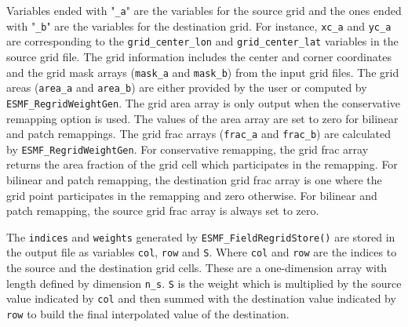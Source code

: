 Variables ended with "{\tt \_a}" are the variables for the source grid and the ones ended with "{\tt \_b}"
are the variables for the destination grid. For instance, {\tt xc\_a} and {\tt yc\_a} are corresponding
to the {\tt grid\_center\_lon} and {\tt grid\_center\_lat} variables in the source grid file.
The grid information includes the center and corner coordinates and the grid mask 
arrays ({\tt mask\_a} and {\tt mask\_b}) from the input grid files.
The grid areas ({\tt area\_a} and {\tt area\_b}) are either provided by the user or computed by 
{\tt ESMF\_RegridWeightGen}. The grid area array is only output when the conservative remapping 
option is used. The values of the area array are set to zero for bilinear and patch remappings.
The grid frac arrays ({\tt frac\_a} and {\tt frac\_b}) are calculated by {\tt ESMF\_RegridWeightGen}. 
For conservative remapping, the grid frac array 
returns the area fraction of the grid cell which participates in the remapping. 
For bilinear and patch remapping, the
destination grid frac array is one where the grid point participates in the remapping
and zero otherwise. For bilinear and patch remapping, the source grid frac array
is always set to zero.

The {\tt indices} and {\tt weights} generated by {\tt ESMF\_FieldRegridStore()} are stored in the output
file as variables {\tt col}, {\tt row} and {\tt S}. Where {\tt col} and {\tt row} are the indices to the
source and the destination grid cells.  These are a one-dimension array with length defined by dimension 
{\tt n\_s}. {\tt S} is the weight which is multiplied by the source value indicated by {\tt col} and then
summed with the destination value indicated by {\tt row} to build the final interpolated value of the 
destination. 


